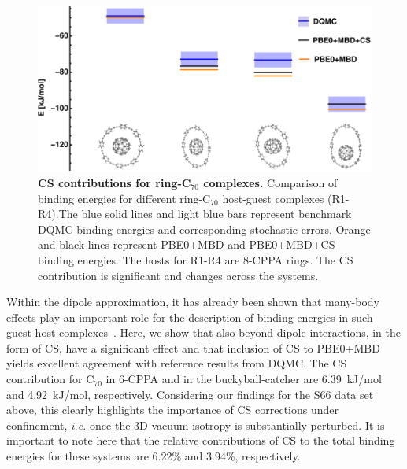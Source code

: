 \documentclass[aps,prl,groupaddress, twocolumn]{revtex4-1}
\begin{document}
\begin{figure}[hbtp]
\includegraphics[scale=1.]{Plots/Rings_new.pdf}
\caption{\textbf{CS contributions for ring-C$_{70}$ complexes.} Comparison of binding energies for different ring-C$_{70}$ host-guest complexes (R1-R4).The blue solid lines and light blue bars represent benchmark DQMC binding energies and corresponding stochastic errors. Orange and black lines represent PBE0+MBD and PBE0+MBD+CS binding energies. The hosts for R1-R4 are 8-CPPA rings. The CS contribution is significant and changes across the systems.}\label{fig:rings}
\end{figure}

Within the dipole approximation, it has already been shown that many-body effects play an important role for the description of binding energies in such guest-host complexes~\cite{hermann_ncomm2017}. Here, we show that also beyond-dipole interactions, in the form of CS, have a significant effect and that inclusion of CS to PBE0+MBD yields excellent agreement with reference results from DQMC. The CS contribution for C$_{70}$ in 6-CPPA and in the buckyball-catcher are 6.39~kJ/mol and 4.92~kJ/mol, respectively. Considering our findings for the S66 data set above, this clearly highlights the importance of CS corrections under confinement, \textit{i.e.} once the 3D vacuum isotropy is substantially perturbed. It is important to note here that the relative contributions of CS to the total binding energies for these systems are 6.22\% and 3.94\%, respectively. 
\end{document}
